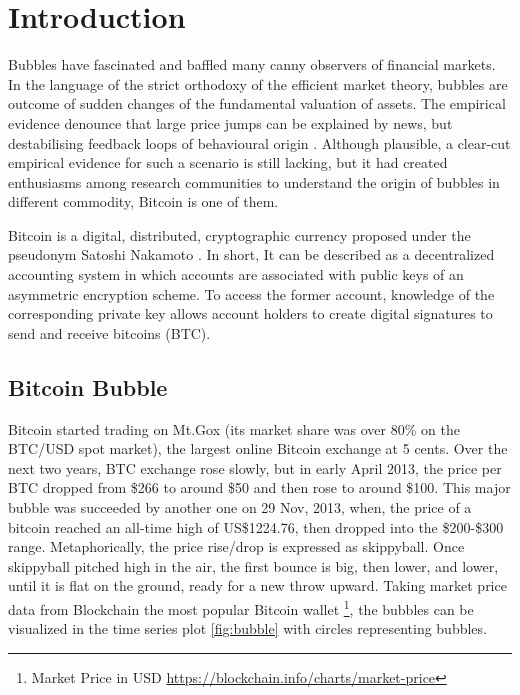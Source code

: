 \chapter{Introduction} %

\label{Chapter1} %


Bubbles have fascinated and baffled many canny observers of financial markets. In the language of the strict orthodoxy of the efficient market theory, bubbles are outcome of sudden changes of the fundamental valuation of assets. The empirical evidence denounce that large price jumps can be explained by news, but destabilising feedback loops of behavioural origin \citep{Donier2015}. Although plausible, a clear-cut empirical evidence for
such a scenario is still lacking, but it had created enthusiasms among research communities to understand the origin of bubbles in different commodity, Bitcoin is one of them.

Bitcoin is a digital, distributed, cryptographic currency proposed under the pseudonym Satoshi Nakamoto \citep{Nakamoto2008}. In short, It can be described as a decentralized accounting system in which accounts are associated with public keys of an asymmetric encryption scheme. To access the former account, knowledge of the corresponding private key allows account holders to create digital signatures to send and receive bitcoins (BTC).

\section{Bitcoin Bubble}
\label{sec:bitcoin_bubble}

Bitcoin started trading on Mt.Gox (its market share was over 80\% on the BTC/USD spot market), the largest online Bitcoin exchange at 5 cents. Over the next	 two	 years,	BTC exchange rose slowly, but in early April 2013, the price per BTC dropped from \$266 to around \$50 and then rose to around \$100. This major bubble was succeeded by another one on 29 Nov, 2013, when, the price of a bitcoin reached an all-time high of US\$1224.76, then dropped into the \$200-\$300 range. Metaphorically, the price rise/drop is expressed as skippyball. Once skippyball pitched high in the air, the first bounce is big, then lower, and lower, until it is flat on the ground, ready for a new throw upward. Taking market price data from Blockchain the most popular Bitcoin wallet \footnote{Market Price in USD \url{https://blockchain.info/charts/market-price}}, the bubbles can be visualized in the time series plot \ref{fig:bubble} with circles representing bubbles.

